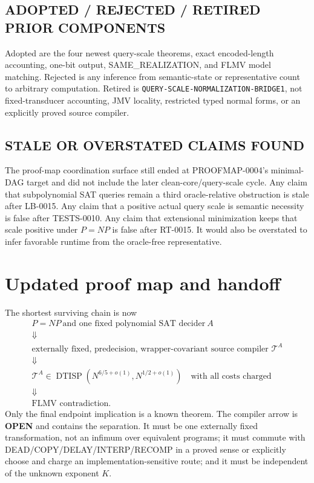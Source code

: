 \documentclass[11pt]{article}
\newcommand{\OPEN}{\textbf{OPEN}}
\begin{document}
\subsection*{ADOPTED / REJECTED / RETIRED PRIOR COMPONENTS}
Adopted are the four newest query-scale theorems, exact encoded-length
accounting, one-bit output, SAME\_REALIZATION, and FLMV model matching.
Rejected is any inference from semantic-state or representative count to
arbitrary computation.  Retired is
\texttt{QUERY-SCALE-NORMALIZATION-BRIDGE1}, not fixed-transducer accounting,
JMV locality, restricted typed normal forms, or an explicitly proved source
compiler.

\subsection*{STALE OR OVERSTATED CLAIMS FOUND}
The proof-map coordination surface still ended at PROOFMAP-0004's minimal-DAG
target and did not include the later clean-core/query-scale cycle.  Any claim
that subpolynomial SAT queries remain a third oracle-relative obstruction is
stale after LB-0015.  Any claim that a positive actual query scale is semantic
necessity is false after TESTS-0010.  Any claim that extensional minimization
keeps that scale positive under $P=NP$ is false after RT-0015.  It would also
be overstated to infer favorable runtime from the oracle-free representative.

\section{Updated proof map and handoff}

The shortest surviving chain is now
\[
\boxed{
\begin{gathered}
P=NP\ \text{and one fixed polynomial SAT decider}\ A\\
\Downarrow\\
\text{externally fixed, predecision, wrapper-covariant source compiler }
\mathcal T^A\\
\Downarrow\\
\mathcal T^A\in\operatorname{DTISP}
 (N^{6/5+o(1)},N^{1/2+o(1)})\quad\text{with all costs charged}\\
\Downarrow\\
\text{FLMV contradiction.}
\end{gathered}}
\]
Only the final endpoint implication is a known theorem.  The compiler arrow
is \OPEN{} and contains the separation.  It must be one externally fixed
transformation, not an infimum over equivalent programs; it must commute
with DEAD/COPY/DELAY/INTERP/RECOMP in a proved sense or explicitly choose and
charge an implementation-sensitive route; and it must be independent of the
unknown exponent $K$.
\end{document}
